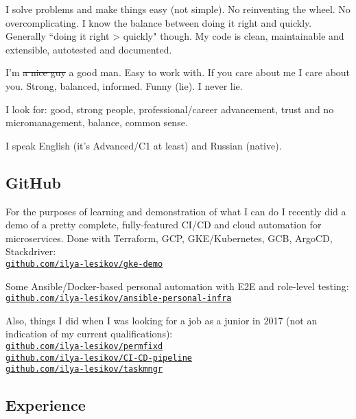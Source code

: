 \documentclass[11pt, a4paper]{article}
\newcommand{\Delimitline}{
  \vspace{-2ex}
  \noindent\makebox[\linewidth]{\rule{\DelimitlineLength}{0.12ex}} }
\newcommand\rurl[1]{%
  \-\hspace{0.5em}
  \href{http://#1}{\nolinkurl{#1}}%
}
\newcommand{\forceindent}{\leavevmode{\parindent=1em\indent}}
\begin{document}
\forceindent I solve problems and make things easy (not simple). No reinventing the wheel. No overcomplicating. I know the balance between doing it right and quickly. Generally ``doing it right > quickly" though. My code is clean, maintainable and extensible, autotested and documented.

\forceindent I'm \sout{a nice guy} a good man. Easy to work with. If you care about me I care about you. Strong, balanced, informed. Funny (lie). I never lie.

\forceindent I look for: good, strong people, professional/career advancement, trust and no micromanagement, balance, common sense.

\forceindent I speak English (it's Advanced/C1 at least) and Russian (native).


\subsection*{GitHub}
\Delimitline

\forceindent For the purposes of learning and demonstration of what I can do I recently did a demo of a pretty complete, fully-featured CI/CD and cloud automation for microservices. Done with Terraform, GCP, GKE/Kubernetes, GCB, ArgoCD, Stackdriver:\vspace{0.2em}\\
\rurl{github.com/ilya-lesikov/gke-demo}

Some Ansible/Docker-based personal automation with E2E and role-level testing:\vspace{0.2em}\\
\rurl{github.com/ilya-lesikov/ansible-personal-infra}

Also, things I did when I was looking for a job as a junior in 2017 (not an indication of my current qualifications):\vspace{0.2em}\\
\rurl{github.com/ilya-lesikov/permfixd}\\
\rurl{github.com/ilya-lesikov/CI-CD-pipeline}\\
\rurl{github.com/ilya-lesikov/taskmngr}


\subsection*{Experience}
\Delimitline
\end{document}
